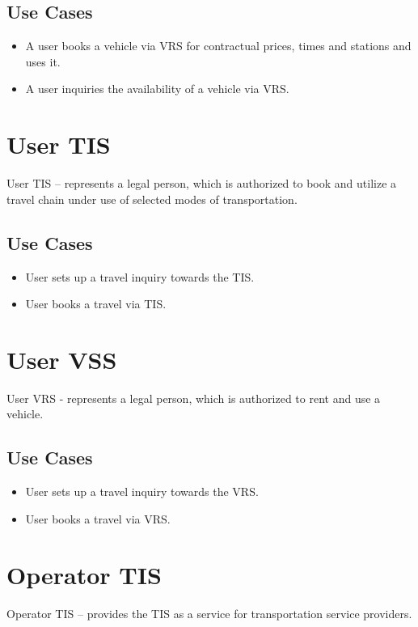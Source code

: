 \subsection*{Use Cases}
\begin{itemize}
\item A user books a vehicle via VRS for contractual prices, times and stations and uses it.
\item A user inquiries the availability of a vehicle via VRS. 
\end{itemize}

\section*{User TIS}
User TIS – represents a legal person, which is authorized to book and utilize a travel chain under use of selected modes of transportation.

\subsection*{Use Cases}
\begin{itemize}
\item User sets up a travel inquiry towards the TIS.
\item User books a travel via TIS.
\end{itemize}

\section*{User VSS}
User VRS - represents a legal person, which is authorized to rent and use a vehicle.

\subsection*{Use Cases}
\begin{itemize}
\item User sets up a travel inquiry towards the VRS.
\item User books a travel via VRS.
\end{itemize}

\section*{Operator TIS}
Operator TIS – provides the TIS as a service for transportation service providers.



